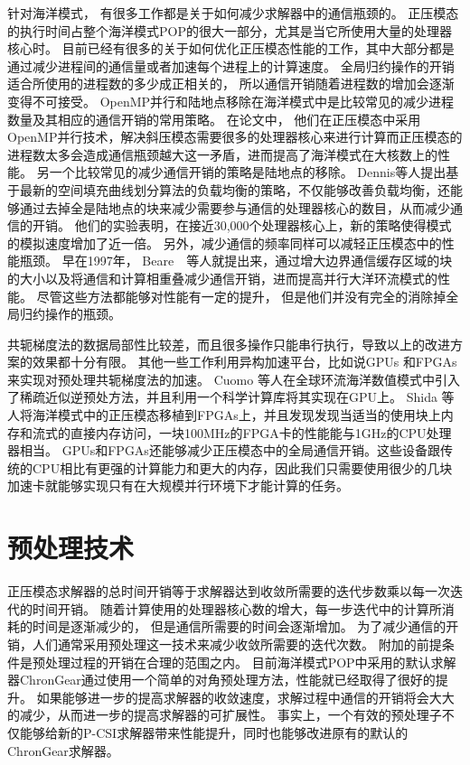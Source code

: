 针对海洋模式， 有很多工作都是关于如何减少求解器中的通信瓶颈的。
正压模态的执行时间占整个海洋模式POP的很大一部分，尤其是当它所使用大量的处理器核心时。
目前已经有很多的关于如何优化正压模态性能的工作，其中大部分都是通过减少进程间的通信量或者加速每个进程上的计算速度。 
全局归约操作的开销适合所使用的进程数的多少成正相关的， 所以通信开销随着进程数的增加会逐渐变得不可接受。
OpenMP并行和陆地点移除在海洋模式中是比较常见的减少进程数量及其相应的通信开销的常用策略。  
在论文\cite{Worley:2011:PCE:2063384.2063457}中， 他们在正压模态中采用OpenMP并行技术，解决斜压模态需要很多的处理器核心来进行计算而正压模态的进程数太多会造成通信瓶颈越大这一矛盾，进而提高了海洋模式在大核数上的性能。 
另一个比较常见的减少通信开销的策略是陆地点的移除\cite{dennis2007inverse,dennis2008scaling}。 
Dennis等人提出基于最新的空间填充曲线划分算法的负载均衡的策略，不仅能够改善负载均衡，还能够通过去掉全是陆地点的块来减少需要参与通信的处理器核心的数目，从而减少通信的开销。 
他们的实验表明，在接近30,000个处理器核心上，新的策略使得模式的模拟速度增加了近一倍。 
另外，减少通信的频率同样可以减轻正压模态中的性能瓶颈。 
 早在1997年，  Beare　\cite{beare1997optimisation}等人就提出来，通过增大边界通信缓存区域的块的大小以及将通信和计算相重叠减少通信开销，进而提高并行大洋环流模式的性能。  
尽管这些方法都能够对性能有一定的提升， 但是他们并没有完全的消除掉全局归约操作的瓶颈。 

 


共轭梯度法的数据局部性比较差，而且很多操作只能串行执行，导致以上的改进方案的效果都十分有限。 
其他一些工作利用异构加速平台，比如说GPUs \cite{cuomo2012pcg} 和FPGAs \cite{Shida2007}来实现对预处理共轭梯度法的加速。 
Cuomo 等人\cite{cuomo2012pcg}在全球环流海洋数值模式中引入了稀疏近似逆预处方法，并且利用一个科学计算库将其实现在GPU上。 
Shida 等人\cite{Shida2007}将海洋模式中的正压模态移植到FPGAs上，并且发现发现当适当的使用块上内存和流式的直接内存访问，一块100MHz的FPGA卡的性能能与1GHz的CPU处理器相当。 
GPUs和FPGAs还能够减少正压模态中的全局通信开销。这些设备跟传统的CPU相比有更强的计算能力和更大的内存，因此我们只需要使用很少的几块加速卡就能够实现只有在大规模并行环境下才能计算的任务。 




\section{预处理技术}
\label{related:precond}

正压模态求解器的总时间开销等于求解器达到收敛所需要的迭代步数乘以每一次迭代的时间开销。
随着计算使用的处理器核心数的增大，每一步迭代中的计算所消耗的时间是逐渐减少的，
但是通信所需要的时间会逐渐增加。 
为了减少通信的开销，人们通常采用预处理这一技术来减少收敛所需要的迭代次数。
附加的前提条件是预处理过程的开销在合理的范围之内。 
目前海洋模式POP中采用的默认求解器ChronGear通过使用一个简单的对角预处理方法，性能就已经取得了很好的提升\cite{pini1990simple, reddy2013comparison}。 
如果能够进一步的提高求解器的收敛速度，求解过程中通信的开销将会大大的减少，从而进一步的提高求解器的可扩展性。
事实上，一个有效的预处理子不仅能够给新的P-CSI求解器带来性能提升，同时也能够改进原有的默认的ChronGear求解器。


